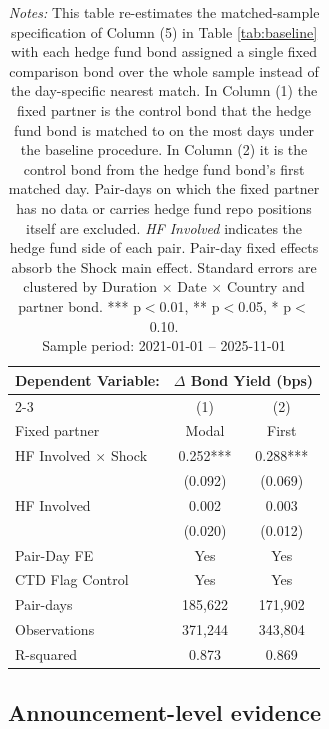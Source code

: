 \documentclass[english, 11pt, oneside]{article}
\begin{document}
\begin{table}[h!]
\centering
\caption{\textbf{Matched-Sample Robustness: Fixed Partners}}
\footnotesize
\setlength{\tabcolsep}{8pt}
\renewcommand{\arraystretch}{1.1}
\begin{tabular}{l c c}
\toprule
\textbf{Dependent Variable:} & \multicolumn{2}{c}{\textbf{$\Delta$ Bond Yield (bps)}} \\
\cmidrule(lr){2-3}
 & (1) & (2) \\
Fixed partner & Modal & First \\
\midrule
HF Involved $\times$ Shock & 0.252*** & 0.288*** \\
 & (0.092) & (0.069) \\
HF Involved & 0.002 & 0.003 \\
 & (0.020) & (0.012) \\
\midrule
Pair-Day FE & Yes & Yes \\
CTD Flag Control & Yes & Yes \\
\midrule
Pair-days & 185,622 & 171,902 \\
Observations & 371,244 & 343,804 \\
R-squared & 0.873 & 0.869 \\
\bottomrule
\end{tabular}
\label{tab:match_stability}
\caption*{\textit{Notes:} This table re-estimates the matched-sample specification of Column (5) in Table \ref{tab:baseline} with each hedge fund bond assigned a single fixed comparison bond over the whole sample instead of the day-specific nearest match. In Column (1) the fixed partner is the control bond that the hedge fund bond is matched to on the most days under the baseline procedure. In Column (2) it is the control bond from the hedge fund bond's first matched day. Pair-days on which the fixed partner has no data or carries hedge fund repo positions itself are excluded. \textit{HF Involved} indicates the hedge fund side of each pair. Pair-day fixed effects absorb the Shock main effect. Standard errors are clustered by Duration $\times$ Date $\times$ Country and partner bond. *** p$<$0.01, ** p$<$0.05, * p$<$0.10. \\ Sample period: 2021-01-01 -- 2025-11-01}
\end{table}

\clearpage
\subsection{Announcement-level evidence}
\label{subsec:announcement}
\end{document}

